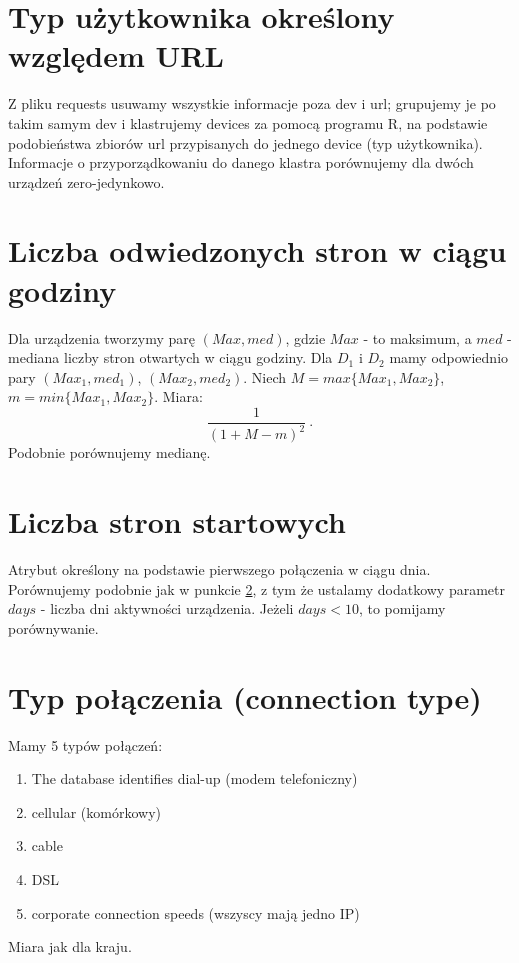 \documentclass[a4paper,11pt]{article}
\begin{document}
\section{{\color{red}Typ użytkownika określony względem URL}}
	Z pliku requests usuwamy wszystkie informacje poza dev i url; grupujemy je po takim samym dev i klastrujemy devices za pomocą programu R, na podstawie podobieństwa zbiorów url przypisanych do jednego device (typ użytkownika). Informacje o przyporządkowaniu do danego klastra porównujemy dla dwóch urządzeń zero-jedynkowo.

\section{Liczba odwiedzonych stron w ciągu godziny} \label{ls}
	Dla urządzenia tworzymy parę $(Max,med)$, gdzie $Max$ - to maksimum, a $med$ - mediana liczby stron otwartych w ciągu godziny. Dla $D_1$ i $D_2$ mamy odpowiednio pary $(Max_1,med_1)$, $(Max_2, med_2)$. Niech $M=max\{Max_1,Max_2\}$, $m=min\{Max_1,Max_2\}$. Miara:
	\[ \frac{1}{(1+M - m)^2} \ .\]
	Podobnie porównujemy medianę.

\section{Liczba stron startowych}

Atrybut określony na podstawie pierwszego połączenia w ciągu dnia. Porównujemy podobnie jak w punkcie \ref{ls}, z tym że ustalamy dodatkowy parametr $days$ - liczba dni aktywności urządzenia. Jeżeli $days < 10$, to pomijamy porównywanie.


\section{{\color{red} Typ połączenia (connection type)}}
	Mamy 5 typów połączeń:
	\begin{enumerate}		
	\item The database identifies dial-up (modem telefoniczny)
	\item cellular (komórkowy) 
	\item cable
	\item DSL
	\item corporate connection speeds (wszyscy mają jedno IP)
\end{enumerate}
	Miara jak dla kraju.
\end{document}
